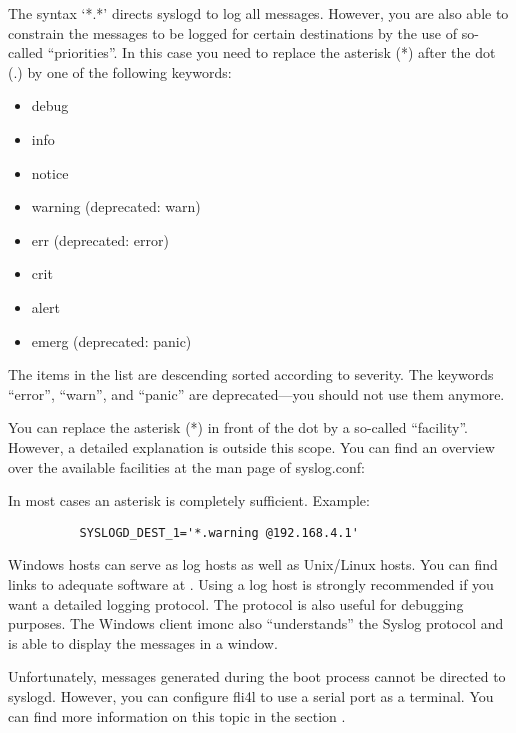 \begin{description}
  The syntax `*.*' directs syslogd to log all messages. However, you are also
  able to constrain the messages to be logged for certain destinations by the
  use of so-called ``priorities''. In this case you need to replace the
  asterisk (*) after the dot (.) by one of the following keywords:
  \begin{itemize}
  \item debug
  \item info
  \item notice
  \item warning (deprecated: warn)
  \item err (deprecated: error)
  \item crit
  \item alert
  \item emerg (deprecated: panic)
  \end{itemize}

  The items in the list are descending sorted according to severity. The
  keywords ``error'', ``warn'', and ``panic'' are deprecated---you should not
  use them anymore.

  You can replace the asterisk (*) in front of the dot by a so-called ``facility''.
  However, a detailed explanation is outside this scope. You can find an
  overview over the available facilities at the man page of syslog.conf:

  \enlargethispage{\baselineskip}
  \noindent {}

  In most cases an asterisk is completely sufficient. Example:
\begin{example}
\begin{verbatim}
          SYSLOGD_DEST_1='*.warning @192.168.4.1'
\end{verbatim}
\end{example}
  Windows hosts can serve as log hosts as well as Unix/Linux hosts. You can
  find links to adequate software at .
  Using a log host is strongly recommended if you want a detailed
  logging protocol. The protocol is also useful for debugging purposes. The Windows
  client imonc also ``understands'' the Syslog protocol and is able to display
  the messages in a window.

  Unfortunately, messages generated during the boot process cannot be
  directed to syslogd. However, you can configure fli4l to use a serial port
  as a terminal. You can find more information on this topic in the section
  .


\end{description}
